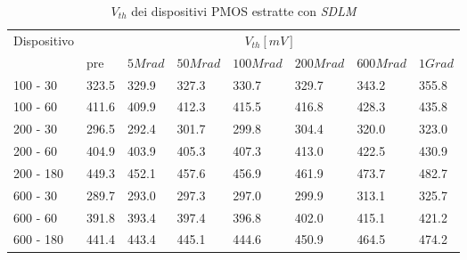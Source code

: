 \documentclass[12pt, letterpaper]{book}
\begin{document}
\begin{table}[H]
  \renewcommand{\arraystretch}{1.3}
    \begin{tabular}{m{2cm} m{0.8cm} m{1.1cm} m{1.3cm} m{1.5cm} m{1.5cm} m{1.5cm} m{1cm}}
      \toprule
      \multirow{2}{*}{Dispositivo} & \multicolumn{7}{c}{$V_{th} [mV] $}                                                                    \\
      \cmidrule{2-8}
                                   	& pre                            	& $5Mrad$ & $50Mrad$ & $100Mrad$ & $200Mrad$ & $600Mrad$ & $1Grad$ \\
      \midrule
      100 - 30                 	& 323.5                          	& 329.9   & 327.3    & 330.7     & 329.7     & 343.2     & 355.8   \\
      \hline
      100 - 60                  	&411.6	                         	& 409.9   & 412.3    & 415.5     & 416.8     & 428.3     & 435.8   \\
      \hline
      200 - 30                  	& 296.5                         	& 292.4   & 301.7    & 299.8     & 304.4     & 320.0     & 323.0   \\
      \hline
      200 - 60                    	& 404.9                         	& 403.9   & 405.3    & 407.3     & 413.0     & 422.5     & 430.9   \\
     \hline
      200 - 180                 	& 449.3                         	& 452.1   & 457.6    & 456.9     & 461.9     & 473.7     & 482.7   \\
      \hline
      600 - 30                  	& 289.7                          	& 293.0   & 297.3    & 297.0     & 299.9     & 313.1     & 325.7   \\
      \hline
      600 - 60                 	& 391.8                        	& 393.4   & 397.4    & 396.8     & 402.0     & 415.1     & 421.2   \\
      \hline
      600 - 180                	& 441.4                         	& 443.4   & 445.1    & 444.6     & 450.9     & 464.5     & 474.2  \\
      \bottomrule
    \end{tabular}
  \caption{$V_{th}$ dei dispositivi PMOS estratte con \emph{SDLM}}
  \label{tab:VthSDLMP}
\end{table}
\end{document}
